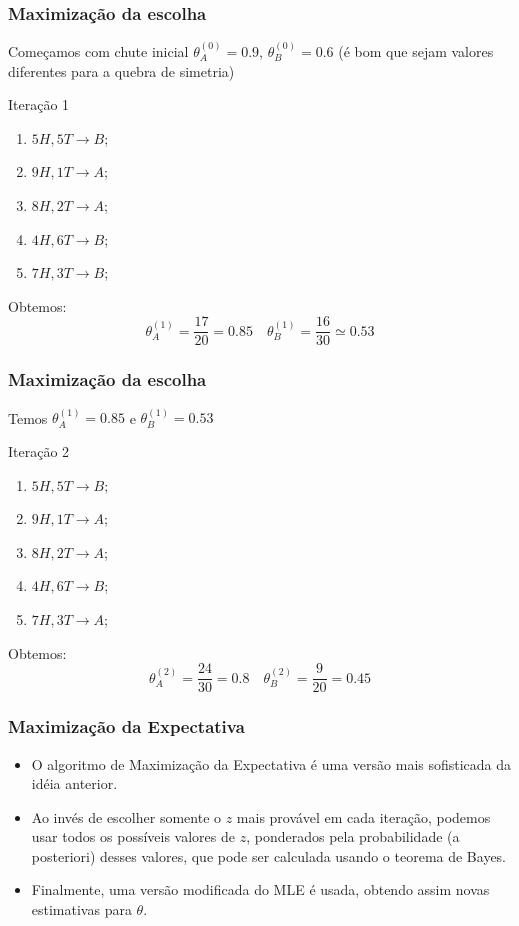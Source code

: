 \documentclass{beamer}
\begin{document}
\begin{frame}
	
	\frametitle{Maximização da escolha}
	Começamos com chute inicial $\theta^{(0)}_A = 0.9$,
	$\theta^{(0)}_B = 0.6$ (é bom que sejam valores diferentes para a quebra
	de simetria)
	\begin{block}{Iteração 1}
		\begin{enumerate}
		\item $5H, 5T$\pause $\to B$;\pause
		\item $9H, 1T$\pause $\to A$;\pause
		\item $8H, 2T$\pause $\to A$;\pause
		\item $4H, 6T$\pause $\to B$;\pause
		\item $7H, 3T$\pause $\to B$;\pause
		\end{enumerate}
	\end{block}
	Obtemos:
	\[
		\theta^{(1)}_A = \frac{17}{20}=0.85\quad
		\theta^{(1)}_B = \frac{16}{30}\simeq 0.53
	\]

\end{frame}

\begin{frame}
	
	\frametitle{Maximização da escolha}
	Temos $\theta^{(1)}_A = 0.85$ e
	$\theta^{(1)}_B = 0.53$
	\begin{block}{Iteração 2}
		\begin{enumerate}
			\item $5H, 5T$\pause $\to B$;\pause
			\item $9H, 1T$\pause $\to A$;\pause
			\item $8H, 2T$\pause $\to A$;\pause
			\item $4H, 6T$\pause $\to B$;\pause
			\item $7H, 3T$\pause $\to A$;\pause
		\end{enumerate}
	\end{block}
	Obtemos:
	\[
	\theta^{(2)}_A = \frac{24}{30}=0.8\quad
	\theta^{(2)}_B = \frac{9}{20}=0.45
	\]
	
\end{frame}

\begin{frame}
	
	\frametitle{Maximização da Expectativa}
	\begin{itemize}
		\item O algoritmo de Maximização da Expectativa é uma versão mais
		sofisticada	da idéia anterior. \pause
		\item Ao invés de escolher somente o $z$ mais provável em cada
		iteração, podemos usar todos os possíveis valores de $z$, ponderados
		pela probabilidade (a posteriori) desses valores, que pode
		ser calculada usando o teorema de Bayes. \pause
		\item Finalmente, uma versão modificada do MLE é usada, obtendo
		assim novas estimativas para $\theta$.
	\end{itemize}

\end{frame}
\end{document}
